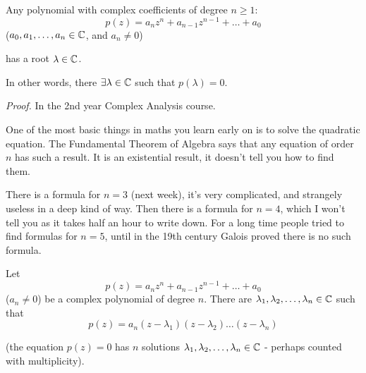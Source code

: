 \documentclass[twoside]{scrartcl}
\begin{document}



\vspace*{10pt}
\begin{theorem}
Any polynomial with complex coefficients of degree $n \geq 1$: 
\[p(z) = a_n z^n + a_{n-1}z^{n-1} + \dots + a_0\]
($a_0,a_1,\dots,a_n \in\mathbb{C}$, and $a_n \neq 0$)

has a root $\lambda \in\mathbb{C}$. 
\end{theorem}\vspace*{5pt}

In other words, there $\exists \lambda \in\mathbb{C}$ such that $p(\lambda) = 0$.

\emph{Proof.} In the 2nd year Complex Analysis course. 

One of the most basic things in maths you learn early on is to solve the quadratic equation. The Fundamental Theorem of Algebra says that any equation of order $n$ has such a result. It is an existential result, it doesn't tell you how to find them.

 There is a formula for $n =3$ (next week), it's very complicated, and strangely useless in a deep kind of way. Then there is a formula for $n=4$, which I won't tell you as it takes half an hour to write down. For a long time people tried to find formulas for $n=5$, until in the 19th century Galois proved there is no such formula.


\begin{corollary}
Let 
\[p(z) = a_n z^n + a_{n-1}z^{n-1} + \dots + a_0\]
($a_n \neq 0$) be a complex polynomial of degree $n$. There are $\lambda_1,\lambda_2,\dots,\lambda_n \in\mathbb{C}$ such that 
\[p(z) = a_n(z-\lambda_1)(z-\lambda_2)\dots(z-\lambda_n)\]
\end{corollary}

(the equation $p(z) = 0$ has $n$ solutions $\lambda_1,\lambda_2,\dots,\lambda_n \in\mathbb{C}$  - perhaps counted with multiplicity). 
\end{document}
